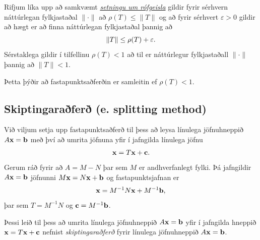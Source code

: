 \documentclass[letterpaper,10pt,icelandic]{sphinxmanual}
\begin{document}
Rifjum líka upp að samkvæmt {\hyperref[kafli08:rofgeisli]{\emph{setningu um rófgeisla}}} gildir
fyrir sérhvern náttúrlegan fylkjastaðal
\(\|\cdot\|\) að \(\rho(T) \leq \|T\|\) og að fyrir sérhvert
\(\varepsilon>0\) gildir að hægt er að finna náttúrlegan
fylkjastaðal þannig að
\begin{gather}
\begin{split}\|T\|\leq \rho(T)+\varepsilon.\end{split}\notag
\end{gather}
Sérstaklega gildir í tilfellinu \(\rho(T)<1\) að til er náttúrlegur
fylkjastaðall \(\|\cdot\|\) þannig að \(\|T\|<1\).

Þetta þýðir að fastapunktsaðferðin er samleitin ef \(\rho(T) < 1\).


\subsection{Skiptingaraðferð (e. splitting method)}
\label{kafli08:index-21}\label{kafli08:skiptingarafer-e-splitting-method}
Við viljum setja upp fastapunktsaðferð til þess að leysa línulega
jöfnuhneppið \(A\mbox{${\bf x}$}=\mbox{${\bf b}$}\) með því að
umrita jöfnuna yfir í jafngilda línulega jöfnu
\begin{gather}
\begin{split}\mbox{${\bf x}$}=T\mbox{${\bf x}$}+\mbox{${\bf c}$}.\end{split}\notag
\end{gather}
Gerum ráð fyrir að \(A=M-N\) þar sem \(M\) er andhverfanlegt
fylki. Þá jafngildir \(A\mbox{${\bf x}$}=\mbox{${\bf b}$}\) jöfnunni
\(M\mbox{${\bf x}$}=N\mbox{${\bf x}$}+\mbox{${\bf b}$}\) og
fastapunktsjafnan er
\begin{gather}
\begin{split}\mbox{${\bf x}$}=M^{-1}N\mbox{${\bf x}$}+M^{-1}\mbox{${\bf b}$},\end{split}\notag
\end{gather}
þar sem \(T = M^{-1}N\) og
\(\mbox{${\bf c}$}= M^{-1}\mbox{${\bf b}$}\).

Þessi leið til þess að umrita línulega jöfnuhneppið
\(A\mbox{${\bf x}$}=\mbox{${\bf b}$}\) yfir í jafngilda hneppið
\(\mbox{${\bf x}$}=T\mbox{${\bf x}$}+\mbox{${\bf c}$}\) nefnist
\emph{skiptingaraðferð} fyrir línulega jöfnuhneppið
\(A\mbox{${\bf x}$}=\mbox{${\bf b}$}\).

\end{document}
